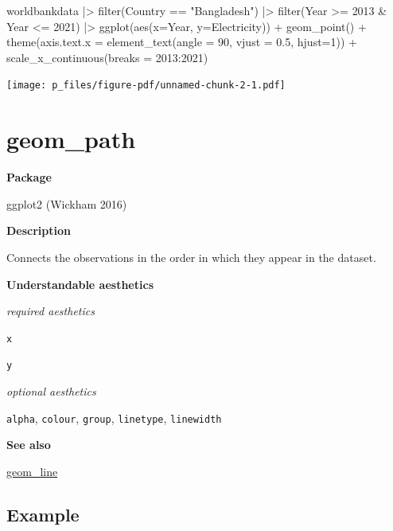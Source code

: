 \documentclass[
  letterpaper,
  DIV=11,
  numbers=noendperiod]{scrreprt}
\newenvironment{Shaded}{\begin{snugshade}}{\end{snugshade}}
\newcommand{\AttributeTok}[1]{\textcolor[rgb]{0.40,0.45,0.13}{#1}}
\newcommand{\DecValTok}[1]{\textcolor[rgb]{0.68,0.00,0.00}{#1}}
\newcommand{\FloatTok}[1]{\textcolor[rgb]{0.68,0.00,0.00}{#1}}
\newcommand{\FunctionTok}[1]{\textcolor[rgb]{0.28,0.35,0.67}{#1}}
\newcommand{\NormalTok}[1]{\textcolor[rgb]{0.00,0.23,0.31}{#1}}
\newcommand{\SpecialCharTok}[1]{\textcolor[rgb]{0.37,0.37,0.37}{#1}}
\newcommand{\StringTok}[1]{\textcolor[rgb]{0.13,0.47,0.30}{#1}}
\begin{document}
\begin{Shaded}
\begin{Highlighting}[]
\NormalTok{worldbankdata }\SpecialCharTok{|\textgreater{}}
  \FunctionTok{filter}\NormalTok{(Country }\SpecialCharTok{==} \StringTok{"Bangladesh"}\NormalTok{) }\SpecialCharTok{|\textgreater{}} 
  \FunctionTok{filter}\NormalTok{(Year }\SpecialCharTok{\textgreater{}=} \DecValTok{2013} \SpecialCharTok{\&}\NormalTok{ Year }\SpecialCharTok{\textless{}=} \DecValTok{2021}\NormalTok{) }\SpecialCharTok{|\textgreater{}}
  \FunctionTok{ggplot}\NormalTok{(}\FunctionTok{aes}\NormalTok{(}\AttributeTok{x=}\NormalTok{Year, }\AttributeTok{y=}\NormalTok{Electricity)) }\SpecialCharTok{+} 
  \FunctionTok{geom\_point}\NormalTok{() }\SpecialCharTok{+}
  \FunctionTok{theme}\NormalTok{(}\AttributeTok{axis.text.x =} \FunctionTok{element\_text}\NormalTok{(}\AttributeTok{angle =} \DecValTok{90}\NormalTok{, }\AttributeTok{vjust =} \FloatTok{0.5}\NormalTok{, }\AttributeTok{hjust=}\DecValTok{1}\NormalTok{)) }\SpecialCharTok{+} 
  \FunctionTok{scale\_x\_continuous}\NormalTok{(}\AttributeTok{breaks =} \DecValTok{2013}\SpecialCharTok{:}\DecValTok{2021}\NormalTok{)  }
\end{Highlighting}
\end{Shaded}

\texttt{[image: p\_files/figure-pdf/unnamed-chunk-2-1.pdf]}

\section{geom\_path}\label{geom_path}

\textbf{Package}

ggplot2 (Wickham 2016)

\textbf{Description}

Connects the observations in the order in which they appear in the
dataset.

\textbf{Understandable aesthetics}

\emph{required aesthetics}

\texttt{x}

\texttt{y}

\emph{optional aesthetics}

\texttt{alpha}, \texttt{colour}, \texttt{group}, \texttt{linetype},
\texttt{linewidth}

\textbf{See also}

\hyperref[line]{geom\_line}

\subsection{Example}\label{example-9}
\end{document}
